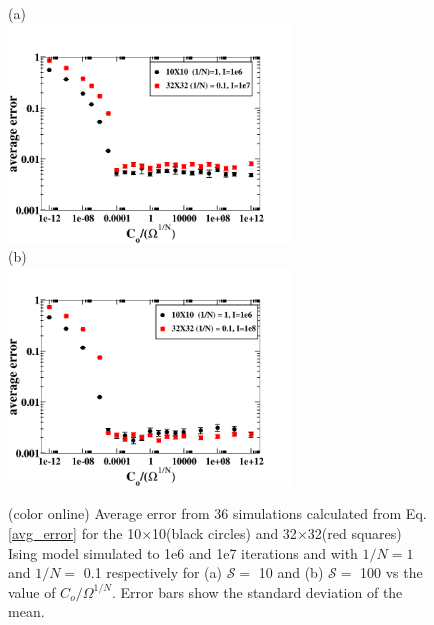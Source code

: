 \documentclass[aps,pre,reprint,superscriptaddress,showkeys]{revtex4-1}
\begin{document}
\begin{figure}[h!]
(a)\\
\includegraphics[width=7.5cm]{./figures/optimalCo_S10.png}\\
(b)\\
\includegraphics[width=7.5cm]{./figures/optimalCo_S100.png}\\
\caption{(color online) Average error from 36 simulations calculated from Eq. \ref{avg_error} for the 10$\times$10(black circles) and 32$\times$32(red squares) Ising model simulated to 1e6 and 1e7 iterations and  with $1/N=1$ and $1/N=$ 0.1 respectively for (a)  $\mathcal{S}=$ 10 and (b) $\mathcal{S}=$ 100 vs the value of $C_{o}/\Omega^{1/N}$. Error bars show the standard deviation of the mean.  \label{optimalCo}}
\end{figure}
\end{document}
